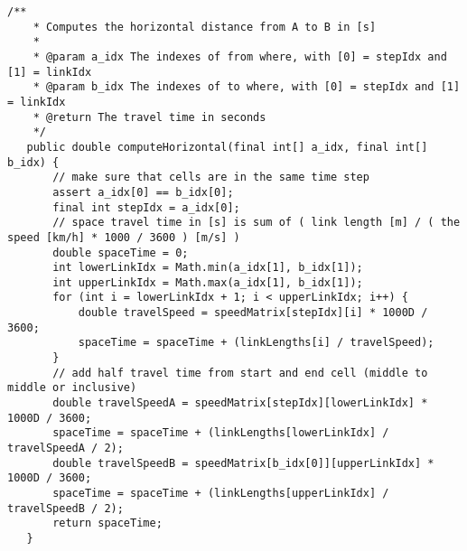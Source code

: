 \begin{lstlisting}[basicstyle=\tiny, style=java, caption={Implementation of \textit{horizontal distance calculation}}, label=lst:distance_calc_horizontal] 
	/**
	* Computes the horizontal distance from A to B in [s]
	*
	* @param a_idx The indexes of from where, with [0] = stepIdx and [1] = linkIdx
	* @param b_idx The indexes of to where, with [0] = stepIdx and [1] = linkIdx
	* @return The travel time in seconds
	*/
   public double computeHorizontal(final int[] a_idx, final int[] b_idx) {
	   // make sure that cells are in the same time step
	   assert a_idx[0] == b_idx[0];
	   final int stepIdx = a_idx[0];
	   // space travel time in [s] is sum of ( link length [m] / ( the speed [km/h] * 1000 / 3600 ) [m/s] )
	   double spaceTime = 0;
	   int lowerLinkIdx = Math.min(a_idx[1], b_idx[1]);
	   int upperLinkIdx = Math.max(a_idx[1], b_idx[1]);
	   for (int i = lowerLinkIdx + 1; i < upperLinkIdx; i++) {
		   double travelSpeed = speedMatrix[stepIdx][i] * 1000D / 3600;
		   spaceTime = spaceTime + (linkLengths[i] / travelSpeed);
	   }
	   // add half travel time from start and end cell (middle to middle or inclusive)
	   double travelSpeedA = speedMatrix[stepIdx][lowerLinkIdx] * 1000D / 3600;
	   spaceTime = spaceTime + (linkLengths[lowerLinkIdx] / travelSpeedA / 2);
	   double travelSpeedB = speedMatrix[b_idx[0]][upperLinkIdx] * 1000D / 3600;
	   spaceTime = spaceTime + (linkLengths[upperLinkIdx] / travelSpeedB / 2);
	   return spaceTime;
   }
\end{lstlisting}

